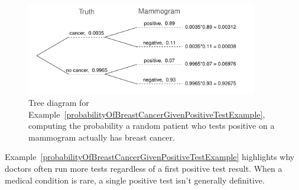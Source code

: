 
\begin{figure}[ht]
\centering
\includegraphics[width=0.9\textwidth]{ch_probability/figures/BreastCancerTreeDiagram/BreastCancerTreeDiagram}
\caption{Tree diagram for Example~\ref{probabilityOfBreastCancerGivenPositiveTestExample}, computing the probability a random patient who tests positive on a mammogram actually has breast cancer.}
\label{BreastCancerTreeDiagram}
\end{figure}

Example~\ref{probabilityOfBreastCancerGivenPositiveTestExample} highlights why doctors often run more tests regardless of a first positive test result. When a medical condition is rare, a single positive test isn't generally definitive.

\D{\newpage}

